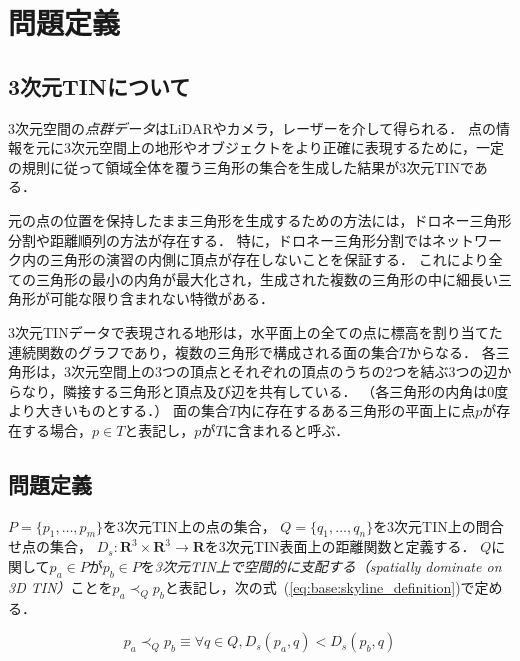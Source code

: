 \documentclass{fit}
\theoremstyle{definition}
\newcommand{\Eq}[1]{式~(#1)}
\begin{document}
\section{問題定義}

\subsection{3次元TINについて}

3次元空間の\emph{点群データ}はLiDARやカメラ，レーザーを介して得られる．
点の情報を元に3次元空間上の地形やオブジェクトをより正確に表現するために，一定の規則に従って領域全体を覆う三角形の集合を生成した結果が3次元TINである．

元の点の位置を保持したまま三角形を生成するための方法には，ドロネー三角形分割や距離順列の方法が存在する．
特に，ドロネー三角形分割ではネットワーク内の三角形の演習の内側に頂点が存在しないことを保証する．
これにより全ての三角形の最小の内角が最大化され，生成された複数の三角形の中に細長い三角形が可能な限り含まれない特徴がある．

3次元TINデータで表現される地形は，水平面上の全ての点に標高を割り当てた連続関数のグラフであり，複数の三角形で構成される面の集合$T$からなる．
各三角形は，3次元空間上の3つの頂点とそれぞれの頂点のうちの2つを結ぶ3つの辺からなり，隣接する三角形と頂点及び辺を共有している．
（各三角形の内角は0度より大きいものとする．）
面の集合$T$内に存在するある三角形の平面上に点$p$が存在する場合，$p \in T$と表記し，$p$が$T$に含まれると呼ぶ．

\subsection{問題定義}

$P =\{p_1,\ldots,p_m\}$を3次元TIN上の点の集合，
$Q =\{q_1,\ldots,q_n\}$を3次元TIN上の問合せ点の集合，
$D_s: \mathbf{R}^3 \times \mathbf{R}^3 \rightarrow \mathbf{R}$を3次元TIN表面上の距離関数と定義する．
$Q$に関して$p_a \in P$が$p_b \in P$を\emph{3次元TIN上で空間的に支配する（spatially dominate on 3D TIN）}ことを$p_a \prec _Q p_b$と表記し，次の\Eq{\ref{eq:base:skyline_definition}}で定める．

\begin{equation}
  \label{eq:base:skyline_definition}
  p_a \prec _Q p_b \equiv \forall q \in Q, D_s(p_a,q) < D_s(p_b,q)
\end{equation}
\end{document}
